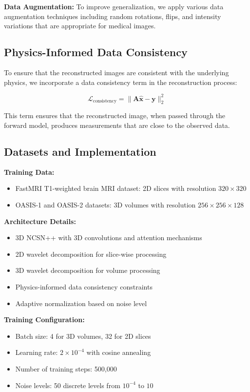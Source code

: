 \documentclass{midl} %
\begin{document}
\textbf{Data Augmentation:} To improve generalization, we apply various data augmentation techniques including random rotations, flips, and intensity variations that are appropriate for medical images.

\subsection{Physics-Informed Data Consistency}

To ensure that the reconstructed images are consistent with the underlying physics, we incorporate a data consistency term in the reconstruction process:

\begin{equation}
\mathcal{L}_{\text{consistency}} = \|\mathbf{A}\hat{\mathbf{x}} - \mathbf{y}\|_2^2
\end{equation}

This term ensures that the reconstructed image, when passed through the forward model, produces measurements that are close to the observed data.

\subsection{Datasets and Implementation}

\textbf{Training Data:}
\begin{itemize}
\item FastMRI T1-weighted brain MRI dataset: 2D slices with resolution $320 \times 320$
\item OASIS-1 and OASIS-2 datasets: 3D volumes with resolution $256 \times 256 \times 128$
\end{itemize}

\textbf{Architecture Details:}
\begin{itemize}
\item 3D NCSN++ with 3D convolutions and attention mechanisms
\item 2D wavelet decomposition for slice-wise processing
\item 3D wavelet decomposition for volume processing
\item Physics-informed data consistency constraints
\item Adaptive normalization based on noise level
\end{itemize}

\textbf{Training Configuration:}
\begin{itemize}
\item Batch size: 4 for 3D volumes, 32 for 2D slices
\item Learning rate: $2 \times 10^{-4}$ with cosine annealing
\item Number of training steps: 500,000
\item Noise levels: 50 discrete levels from $10^{-4}$ to $10$
\end{itemize}
\end{document}
